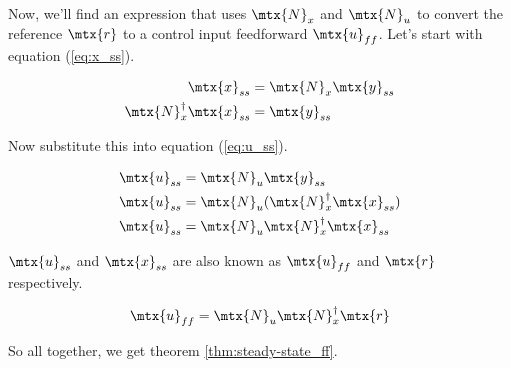 Now, we'll find an expression that uses $\mtx{N}_x$ and $\mtx{N}_u$ to convert
the \gls{reference} $\mtx{r}$ to a \gls{control input} feedforward
$\mtx{u}_{ff}$. Let's start with equation (\ref{eq:x_ss}).

\begin{align*}
  \mtx{x}_{ss} &= \mtx{N}_x \mtx{y}_{ss} \\
  \mtx{N}_x^\dagger \mtx{x}_{ss} &= \mtx{y}_{ss}
\end{align*}

Now substitute this into equation (\ref{eq:u_ss}).

\begin{align*}
  \mtx{u}_{ss} &= \mtx{N}_u \mtx{y}_{ss} \\
  \mtx{u}_{ss} &= \mtx{N}_u (\mtx{N}_x^\dagger \mtx{x}_{ss}) \\
  \mtx{u}_{ss} &= \mtx{N}_u \mtx{N}_x^\dagger \mtx{x}_{ss}
\end{align*}

$\mtx{u}_{ss}$ and $\mtx{x}_{ss}$ are also known as $\mtx{u}_{ff}$ and $\mtx{r}$
respectively.

\begin{align*}
  \mtx{u}_{ff} = \mtx{N}_u \mtx{N}_x^\dagger \mtx{r}
\end{align*}

So all together, we get theorem \ref{thm:steady-state_ff}.

